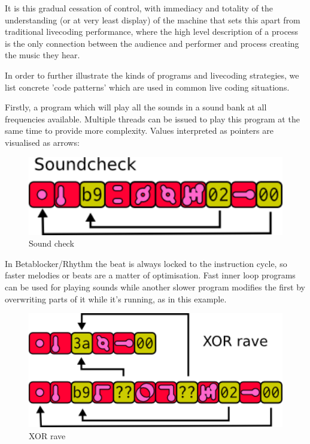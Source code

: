 \documentclass[letterpaper, 12pt]{article}
\begin{document}
It is this gradual cessation of control, with immediacy and totality of the understanding (or at very least display) of the machine that sets this apart from traditional livecoding performance, where the high level description of a process is the only connection between the audience and performer and process creating the music they hear.

In order to further illustrate the kinds of programs and livecoding strategies, we list concrete 'code patterns' which are used in common live coding situations.

Firstly, a program which will play all the sounds in a sound bank at all frequencies available. 
Multiple threads can be issued to play this program at the same time to provide more complexity. 
Values interpreted as pointers are visualised as arrows:

\begin{figure}
	\centering
		\includegraphics[width=13cm]{bbds-sndchk1}
	\caption{Sound check}
	\label{fig:fig_bbds-sndchk1}
\end{figure}

In Betablocker/Rhythm the beat is always locked to the instruction cycle, so faster melodies or beats are a matter of optimisation. Fast inner loop programs can be used for playing sounds while another slower program modifies the first by overwriting parts of it while it's running, as in this example. 

\begin{figure}
	\centering
		\includegraphics[width=13cm]{bbds-xorrave}
	\caption{XOR rave}
	\label{fig:fig_bbds-xorrave}
\end{figure}
\end{document}
